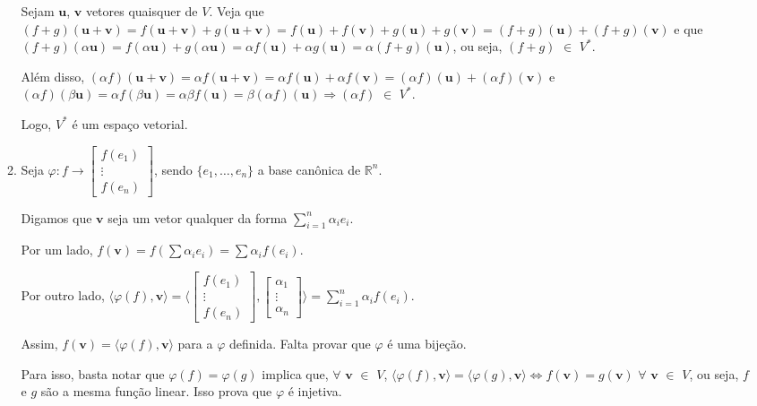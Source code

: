 \documentclass[leqno]{article}
\begin{document}
\begin{enumerate}
\begin{enumerate}
        Sejam $\textbf{u}$, $\textbf{v}$ vetores quaisquer de $V$. Veja que $(f+g)(\textbf{u}+\textbf{v})=f(\textbf{u}+\textbf{v})+g(\textbf{u}+\textbf{v})=f(\textbf{u})+f(\textbf{v})+g(\textbf{u})+g(\textbf{v})=(f+g)(\textbf{u})+(f+g)(\textbf{v})$ e que $(f+g)(\alpha\textbf{u})=f(\alpha\textbf{u})+g(\alpha\textbf{u})=\alpha f(\textbf{u})+\alpha g(\textbf{u})=\alpha(f+g)(\textbf{u})$, ou seja, $(f+g)$ $\in$ $V^*$.
        
        Além disso, $(\alpha f)(\textbf{u}+\textbf{v})=\alpha f(\textbf{u}+\textbf{v})=\alpha f(\textbf{u})+\alpha f(\textbf{v})=(\alpha f)(\textbf{u})+(\alpha f)(\textbf{v})$ e $(\alpha f)(\beta\textbf{u})=\alpha f(\beta\textbf{u})=\alpha\beta f(\textbf{u})=\beta(\alpha f)(\textbf{u})\Rightarrow (\alpha f)$ $\in$ $V^*$.
        
        Logo, $V^*$ é um espaço vetorial.
        
        \item Seja $\varphi: f\rightarrow\begin{bmatrix}
        f(e_1)\\
        \vdots\\
        f(e_n)
        \end{bmatrix}$, sendo $\{e_1, \dots, e_n\}$ a base canônica de $\mathbb{R}^n$.
        
        Digamos que $\textbf{v}$ seja um vetor qualquer da forma $\sum_{i=1}^n \alpha_ie_i$.
        
        Por um lado, $f(\textbf{v})=f(\sum \alpha_ie_i)=\sum \alpha_if(e_i)$.
        
        Por outro lado, $\langle\varphi(f),\textbf{v} \rangle=\langle\begin{bmatrix}
        f(e_1)\\
        \vdots\\
        f(e_n)
        \end{bmatrix},\begin{bmatrix}
        \alpha_1\\
        \vdots\\
        \alpha_n
        \end{bmatrix}\rangle=\sum_{i=1}^n \alpha_if(e_i)$.
        
        Assim, $f(\textbf{v})=\langle\varphi(f),\textbf{v}\rangle$ para a $\varphi$ definida. Falta provar que $\varphi$ é uma bijeção.
        
        Para isso, basta notar que $\varphi(f)=\varphi(g)$ implica que, $\forall$ $\textbf{v}$ $\in$ $V$, $\langle\varphi(f), \textbf{v}\rangle=\langle\varphi(g),\textbf{v}\rangle\iff f(\textbf{v})=g(\textbf{v})$ $\forall$ $\textbf{v}$ $\in$ $V$, ou seja, $f$ e $g$ são a mesma função linear. Isso prova que $\varphi$ é injetiva.
        

\end{enumerate}
\end{enumerate}
\end{document}
